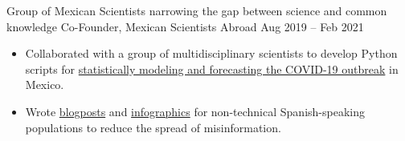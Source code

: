 %
{Group of Mexican Scientists narrowing the gap between science and common knowledge}%
{Co-Founder, Mexican Scientists Abroad}%
{Aug 2019 -- Feb 2021}%
{}%
{%
\begin{itemize}
    \item Collaborated with a group of multidisciplinary scientists to develop Python scripts for \href{https://mexiciencia.github.io/post/covid19/}{statistically modeling and forecasting the COVID-19 outbreak} in Mexico. 
    \item Wrote \href{https://mexiciencia.github.io/post/modelo-sir/}{blogposts} and \href{https://mexiciencia.github.io/post/anita/}{infographics} for non-technical Spanish-speaking populations to reduce the spread of misinformation.
\end{itemize}
}

